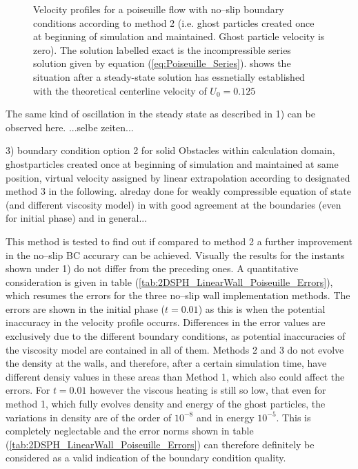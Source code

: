 \documentclass{report}
\begin{document}
\begin{figure}[!htbp]
\caption[Velocity profiles Poiseuille flow]{Velocity profiles for a poiseuille flow with no--slip boundary conditions according to method 2 (i.e. ghost particles created once at beginning of simulation and maintained. Ghost particle velocity is zero). The solution labelled exact is the incompressible series solution given by equation (\ref{eq:Poiseuille_Series}).   shows the situation after a steady-state solution has essnetially established with the theoretical centerline velocity of $U_0=0.125$}

\end{figure}

The same kind of oscillation in the steady state as described in 1) can be observed here. ...selbe zeiten...


3) boundary condition option 2 for solid Obstacles within calculation domain,
 ghostparticles created once at beginning of simulation and maintained at same position, virtual velocity assigned by linear extrapolation according to \cite{Morris1009, Morris1999} designated method 3 in the following.
alreday done for weakly compressible equation of state (and different viscosity model) in \cite{Morris1997} with good agreement at the boundaries (even for initial phase) and in general... 

This method is tested to find out if compared to method 2 a further improvement in the no--slip BC accurary can be achieved. Visually the results for the instants shown under 1) do not differ from the preceding ones. A quantitative consideration is given in table (\ref{tab:2DSPH_LinearWall_Poiseuille_Errors}), which resumes the errors for the three no--slip wall implementation methods. The errors are shown in the initial phase ($t=0.01$) as this is when the potential inaccuracy in the velocity profile occurrs. Differences in the error values are exclusively due to the different boundary conditions, as potential inaccuracies of the viscosity model are contained in all of them. Methods 2 and 3 do not evolve the density at the walls, and therefore, after a certain simulation time, have different densiy values in these areas than Method 1, which also could affect the errors. For $t=0.01$ however the viscous heating is still so low, that even for method 1, which fully evolves density and energy of the ghost particles, the variations in density are of the order of $10^{-8}$ and in energy $10^{-5}$. This is completely neglectable and the error norms shown in table (\ref{tab:2DSPH_LinearWall_Poiseuille_Errors}) can therefore definitely be considered as a valid indication of the boundary condition quality.
\end{document}
